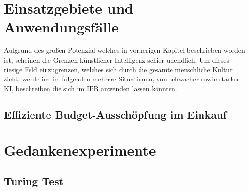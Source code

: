 \documentclass[a4paper,12pt,german,ngerman]{report}
\begin{document}
    



    \chapter{Einsatzgebiete und Anwendungsfälle}
    Aufgrund des großen Potenzial welches in vorherigen Kapitel beschrieben worden ist, scheinen
    die Grenzen künstlicher Intelligenz schier unendlich. Um dieses riesige Feld einzugrenzen,
    welches sich durch die gesamte menschliche Kultur zieht, werde ich im folgenden mehrere
    Situationen, von schwacher sowie starker KI, beschreiben die sich im IPB anwenden lassen könnten.

    \section{Effiziente Budget-Ausschöpfung im Einkauf}
    \section{}
    \section{}
    \section{}

    \chapter{Gedankenexperimente}

    \section{Turing Test}
    \autocite{turing1950computing}
\end{document}
